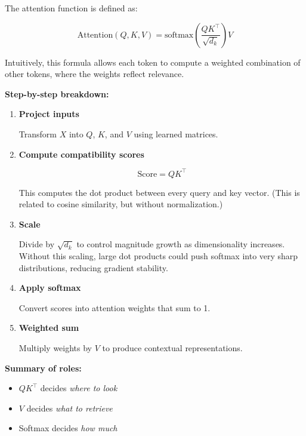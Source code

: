 \documentclass[11pt]{article}
\begin{document}
The attention function is defined as:

\begin{equation}
\boxed{
\text{Attention}(Q,K,V)
=
\text{softmax}
\left(
\frac{QK^\top}{\sqrt{d_k}}
\right)V
}
\label{eq:attention}
\end{equation}

\noindent
Intuitively, this formula allows each token to compute a weighted combination of other tokens, where the weights reflect relevance.

\noindent\textbf{Step-by-step breakdown:}

\begin{enumerate}[nosep]

\item \textbf{Project inputs}

Transform $X$ into $Q$, $K$, and $V$ using learned matrices.

\item \textbf{Compute compatibility scores}

\[
\text{Score} = QK^\top
\]

This computes the dot product between every query and key vector. (This is related to cosine similarity, but without normalization.)

\item \textbf{Scale}

Divide by $\sqrt{d_k}$ to control magnitude growth as dimensionality increases. Without this scaling, large dot products could push softmax into very sharp distributions, reducing gradient stability.

\item \textbf{Apply softmax}

Convert scores into attention weights that sum to 1.

\item \textbf{Weighted sum}

Multiply weights by $V$ to produce contextual representations.

\end{enumerate}

\noindent\textbf{Summary of roles:}

\begin{itemize}[nosep]

\item $QK^\top$ decides \emph{where to look}
\item $V$ decides \emph{what to retrieve}
\item Softmax decides \emph{how much}

\end{itemize}
\end{document}
